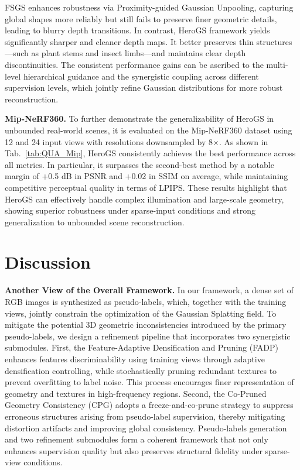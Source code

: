 FSGS enhances robustness via Proximity-guided Gaussian Unpooling, capturing global shapes more reliably but still fails to preserve finer geometric details, leading to blurry depth transitions. In contrast, HeroGS framework yields significantly sharper and cleaner depth maps. It better preserves thin structures—such as plant stems and insect limbs—and maintains clear depth discontinuities. The consistent performance gains can be ascribed to the multi-level hierarchical guidance and the synergistic coupling across different supervision levels, which jointly refine Gaussian distributions for more robust reconstruction.

\textbf{Mip-NeRF360.}
To further demonstrate the generalizability of HeroGS in unbounded real-world scenes, it is evaluated on the Mip-NeRF360 dataset using 12 and 24 input views with resolutions downsampled by 8$\times$. As shown in Tab.~\ref{tab:QUA_Mip}, HeroGS consistently achieves the best performance across all metrics. In particular, it surpasses the second-best method by a notable margin of +0.5 dB in PSNR and +0.02 in SSIM on average, while maintaining competitive perceptual quality in terms of LPIPS. These results highlight that HeroGS can effectively handle complex illumination and large-scale geometry, showing superior robustness under sparse-input conditions and strong generalization to unbounded scene reconstruction.

\section{Discussion}
\textbf{Another View of the Overall Framework.}
In our framework, a dense set of RGB images is synthesized as pseudo-labels, which, together with the training views, jointly constrain the optimization of the Gaussian Splatting field. To mitigate the potential 3D geometric inconsistencies introduced by the primary pseudo-labels, we design a refinement pipeline that incorporates two synergistic submodules. First, the Feature-Adaptive Densification and Pruning (FADP) enhances features discriminability using training views through adaptive densification controlling, while stochastically pruning redundant textures to prevent overfitting to label noise. This process encourages finer representation of geometry and textures in high-frequency regions. Second, the Co-Pruned Geometry Consistency (CPG) adopts a freeze-and-co-prune strategy to suppress erroneous structures arising from pseudo-label supervision, thereby mitigating distortion artifacts and improving global consistency. Pseudo-labels generation and two refinement submodules form a coherent framework that not only enhances supervision quality but also preserves structural fidelity under sparse-view conditions.

